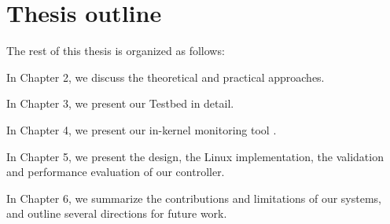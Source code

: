 \section{Thesis outline}
\label{sec:intro:outline}

The rest of this thesis is organized as follows:

\begin{compactitem}
  \item In Chapter 2, we discuss the theoretical and practical approaches.
  \item In Chapter 3, we present our Testbed in detail.
  \item In Chapter 4, we present our in-kernel monitoring tool .
  \item In Chapter 5, we present the design, the Linux implementation, the validation and performance evaluation of our controller.
  \item In Chapter 6, we summarize the contributions and limitations of our systems, and outline several directions for future work.
\end{compactitem}